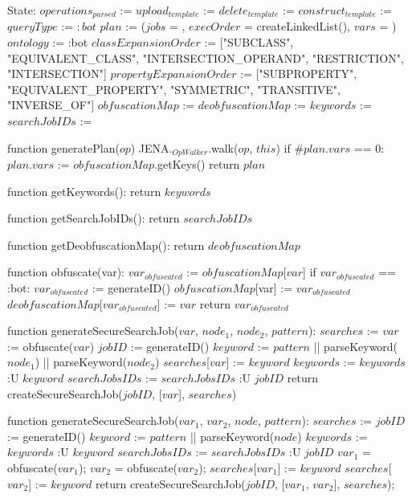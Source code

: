 State:
    $operations_{parsed}$ := {}
    $upload_{template}$ := {}
    $delete_{template}$ := {}
    $construct_{template}$ := {}
    $queryType$ := $:bot$
    $plan$ := ($jobs$ = {}, $execOrder$ = createLinkedList(), $vars$ = {})
    $ontology$ := :bot
    $classExpansionOrder$ := ["SUBCLASS", "EQUIVALENT_CLASS", "INTERSECTION_OPERAND", "RESTRICTION", "INTERSECTION"]
    $propertyExpansionOrder$ := ["SUBPROPERTY", "EQUIVALENT_PROPERTY", "SYMMETRIC", "TRANSITIVE", "INVERSE_OF"]
    $obfuscationMap$ := {}
    $deobfuscationMap$ := {}
    $keywords$ := {}
    $searchJobIDs$ := {}

function generatePlan($op$) 
    JENA.$_{OpWalker}$.walk($op$, $this$)
    if $\#plan.vars$ == 0:
        $plan.vars$ := $obfuscationMap$.getKeys()
    return $plan$

function getKeywords():
    return $keywords$

function getSearchJobIDs():
    return $searchJobIDs$    

function getDeobfuscationMap():
    return $deobfuscationMap$

function obfuscate(var):
    $var_{obfuscated}$ := $obfuscationMap$[$var$]
    if $var_{obfuscated}$ == :bot:
        $var_{obfuscated}$ := generateID()
        $obfuscationMap$[var] := $var_{obfuscated}$
        $deobfuscationMap$[$var_{obfuscated}$] := $var$
    return $var_{obfuscated}$

function generateSecureSearchJob($var$, $node_1$, $node_2$, $pattern$):
    $searches$ := {}
    $var$ := obfuscate($var$)
    $jobID$ := generateID()
    $keyword$ := $pattern$ || parseKeyword($node_1$) || parseKeyword($node_2$)
    $searches$[$var$] := $keyword$
    $keywords$ := $keywords$ :U { $keyword$ }
    $searchJobsIDs$ := $searchJobsIDs$ :U { $jobID$ }
    return createSecureSearchJob($jobID$, [$var$], $searches$)

function generateSecureSearchJob($var_1$, $var_2$, $node$, $pattern$):
    $searches$ := {}
    $jobID$ := generateID()
    $keyword$ := $pattern$ || parseKeyword($node$)
    $keywords$ := $keywords$ :U { $keyword$ }
    $searchJobsIDs$ := $searchJobsIDs$ :U { $jobID$ }
    $var_1$ = obfuscate($var_1$);
    $var_2$ = obfuscate($var_2$);
    $searches$[$var_1$] := $keyword$
    $searches$[$var_2$] := $keyword$
    return createSecureSearchJob($jobID$, [$var_1$, $var_2$], $searches$);


